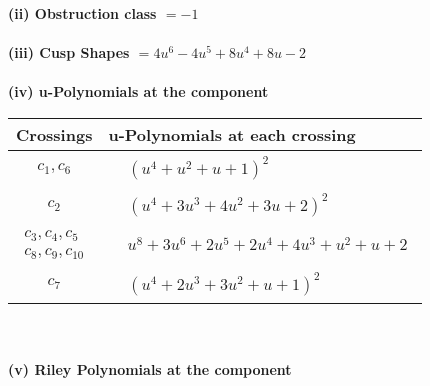 \documentclass[1p]{elsarticle_modified}
\theoremstyle{definition}
\begin{document}
\flushleft \textbf{(ii) Obstruction class $= -1$}\\~\\
\flushleft \textbf{(iii) Cusp Shapes $= 4 u^6-4 u^5+8 u^4+8 u-2$}\\~\\
\newpage\renewcommand{\arraystretch}{1}
\flushleft \textbf{(iv) u-Polynomials at the component}\newline \\
\begin{tabular}{m{50pt}|m{274pt}}
Crossings & \hspace{64pt}u-Polynomials at each crossing \\
\hline $$\begin{aligned}c_{1},c_{6}\end{aligned}$$&$\begin{aligned}
&(u^4+u^2+u+1)^2
\end{aligned}$\\
\hline $$\begin{aligned}c_{2}\end{aligned}$$&$\begin{aligned}
&(u^4+3 u^3+4 u^2+3 u+2)^2
\end{aligned}$\\
\hline $$\begin{aligned}c_{3},c_{4},c_{5}\\c_{8},c_{9},c_{10}\end{aligned}$$&$\begin{aligned}
&u^8+3 u^6+2 u^5+2 u^4+4 u^3+u^2+u+2
\end{aligned}$\\
\hline $$\begin{aligned}c_{7}\end{aligned}$$&$\begin{aligned}
&(u^4+2 u^3+3 u^2+u+1)^2
\end{aligned}$\\
\hline
\end{tabular}\\~\\
\newpage\renewcommand{\arraystretch}{1}
\flushleft \textbf{(v) Riley Polynomials at the component}\newline \\
\end{document}
